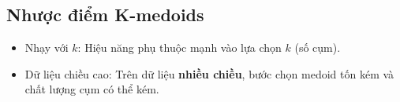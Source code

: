 \subsection{Nhược điểm K-medoids}

\begin{luuy}[title={Nhược điểm K-medoids}]
  \begin{itemize}
    \item Nhạy với $k$: Hiệu năng phụ thuộc mạnh vào lựa chọn $k$ (số cụm).
    \item Dữ liệu chiều cao: Trên dữ liệu \textbf{nhiều chiều}, bước chọn medoid tốn kém và chất lượng cụm có thể kém.
  \end{itemize}
\end{luuy}
